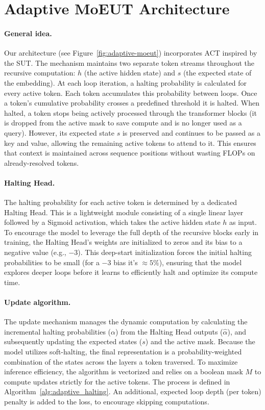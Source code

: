 \documentclass[11pt]{article}
\begin{document}
\section{Adaptive MoEUT Architecture}

\paragraph{General idea.}
Our architecture (see Figure~\ref{fig:adaptive-moeut}) incorporates ACT inspired by the SUT.
The mechanism maintains two separate token streams throughout the recursive computation: $h$ (the active hidden state) and $s$ (the expected state of the embedding).
At each loop iteration, a halting probability is calculated for every active token.
Each token accumulates this probability between loops.
Once a token's cumulative probability crosses a predefined threshold it is halted.
When halted, a token stops being actively processed through the transformer blocks (it is dropped from the active mask to save compute and is no longer used as a query).
However, its expected state $s$ is preserved and continues to be passed as a key and value, allowing the remaining active tokens to attend to it.
This ensures that context is maintained across sequence positions without wasting FLOPs on already-resolved tokens.

\paragraph{Halting Head.}
The halting probability for each active token is determined by a dedicated Halting Head.
This is a lightweight module consisting of a single linear layer followed by a Sigmoid activation, which takes the active hidden state $h$ as input.
To encourage the model to leverage the full depth of the recursive blocks early in training, the Halting Head's weights are initialized to zeros and its bias to a negative value (e.g., $-3$).
This deep-start initialization forces the initial halting probabilities to be small (for a $-3$ bias it's $\approx5\%$), ensuring that the model explores deeper loops before it learns to efficiently halt and optimize its compute time.

\paragraph{Update algorithm.}
The update mechanism manages the dynamic computation by calculating the incremental halting probabilities ($\alpha$) from the Halting Head outputs ($\hat{\alpha}$), and subsequently updating the expected states ($s$) and the active mask.
Because the model utilizes soft-halting, the final representation is a probability-weighted combination of the states across the layers a token traversed.
To maximize inference efficiency, the algorithm is vectorized and relies on a boolean mask $M$ to compute updates strictly for the active tokens.
The process is defined in Algorithm~\ref{alg:adaptive_halting}.
An additional, expected loop depth (per token) penalty is added to the loss, to encourage skipping computations.
\end{document}
